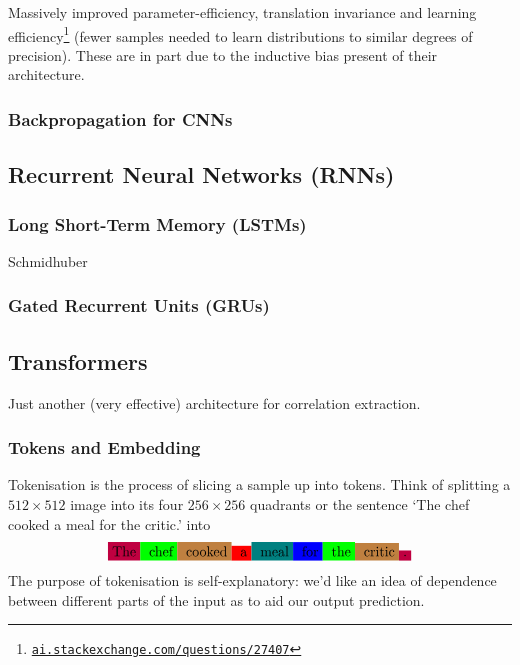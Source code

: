\documentclass[11pt]{article}
\begin{document}
\begin{tcolorbox}[title={\centering\textbf{Why use a CNN over an MLP?}}, colback=myLightBlue, colbacktitle=myDarkBlue, colframe=myDarkBlue, coltitle=white]
    Massively improved parameter-efficiency, translation invariance and learning efficiency\footnote{\href{https://ai.stackexchange.com/questions/27407/what-does-statistical-efficiency-mean-in-this-context}{\texttt{ai.stackexchange.com/questions/27407}}} (fewer samples needed to learn distributions to similar degrees of precision). These are in part due to the inductive bias present of their architecture.
\end{tcolorbox}

\subsubsection{Backpropagation for CNNs}

\subsection{\TODO Recurrent Neural Networks (RNNs)}

\subsubsection{Long Short-Term Memory (LSTMs)}
Schmidhuber

\subsubsection{Gated Recurrent Units (GRUs)}

\subsection{\TODO Transformers}
Just another (very effective) architecture for correlation extraction.

\subsubsection{Tokens and Embedding}
Tokenisation is the process of slicing a sample up into tokens. Think of splitting a $512\times512$ image into its four $256\times256$ quadrants or the sentence `The chef cooked a meal for the critic.' into
$$
\colorbox{purple}{The}\colorbox{green}{ chef}\colorbox{brown}{ cooked}\colorbox{red}{ a}\colorbox{teal}{ meal}\colorbox{blue}{ for}\colorbox{green}{ the}\colorbox{brown}{ critic}\colorbox{purple}{.}
$$
The purpose of tokenisation is self-explanatory: we'd like an idea of dependence between different parts of the input as to aid our output prediction.
\end{document}
